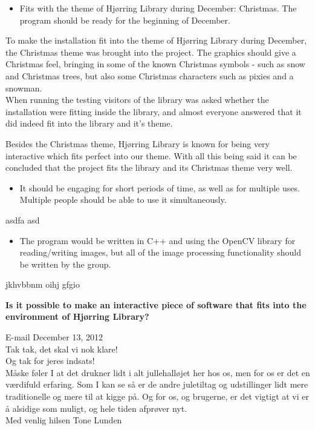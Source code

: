 \begin{itemize}
\item Fits with the theme of Hj{\o}rring Library during December: Christmas. The program should be ready for the beginning of December.
\end{itemize}
To make the installation fit into the theme of Hj{\o}rring Library during December, the Christmas theme was brought into the project. The graphics should give a Christmas feel, bringing in some of the known Christmas symbols - such as snow and Christmas trees, but also some Christmas characters such as pixies and a snowman.\\
When running the testing visitors of the library was asked whether the installation were fitting inside the library, and almost everyone answered that it did indeed fit into the library and it's theme.

Besides the Christmas theme, Hj{\o}rring Library is known for being very interactive which fits perfect into our theme. With all this being said it can be concluded that the project fits the library and its Christmas theme very well.

\begin{itemize}
\item It should be engaging for short periods of time, as well as for multiple uses. Multiple people should be able to use it simultaneously.
\end{itemize}
asdfa asd 

\begin{itemize}
\item The program would be written in C++ and using the OpenCV library for reading/writing images, but all of the image processing functionality should be written by the group.
\end{itemize}
jkhvbbnm oihj gfgio

\textbf{Is it possible to make an interactive piece of software that fits into the environment of Hj{\o}rring Library?}

\begin{fancyquotes}
E-mail December 13, 2012\\
Tak tak, det skal vi nok klare!\\

Og tak for jeres indsats!\\
M{\aa}ske f{\o}ler I at det drukner lidt i alt jullehall{\o}jet her hos os, men for os er det en v{\ae}rdifuld erfaring. Som I kan se s{\aa} er de andre juletiltag og udstillinger lidt mere traditionelle og mere til at kigge p{\aa}. Og for os, og brugerne, er det vigtigt at vi er {\aa} alsidige som muligt, og hele tiden afpr{\o}ver nyt.\\

Med venlig hilsen
Tone Lunden
\end{fancyquotes}